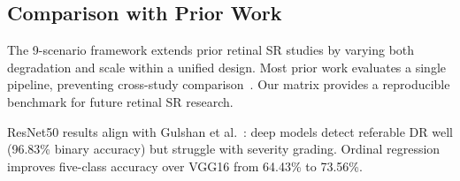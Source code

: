 \subsection{Comparison with Prior Work}

The 9-scenario framework extends prior retinal SR studies by varying both degradation and scale within a unified design.
Most prior work evaluates a single pipeline, preventing cross-study comparison~\cite{zhang2020}.
Our matrix provides a reproducible benchmark for future retinal SR research.

ResNet50 results align with Gulshan et al.~\cite{gulshan2016}: deep models detect referable DR well (96.83\% binary accuracy) but struggle with severity grading.
Ordinal regression improves five-class accuracy over VGG16 from 64.43\% to 73.56\%.
